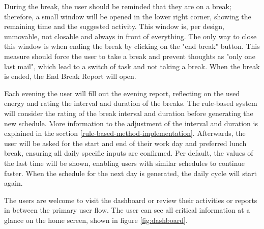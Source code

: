 \documentclass{hasel_thesis}
\begin{document}
During the break, the user should be reminded that they are on a break; therefore, a small window will be opened in the lower right corner, showing the remaining time and the suggested activity. This window is, per design, unmovable, not closable and always in front of everything. The only way to close this window is when ending the break by clicking on the "end break" button. This measure should force the user to take a break and prevent thoughts as "only one last mail", which lead to a switch of task and not taking a break. When the break is ended, the End Break Report will open.


Each evening the user will fill out the evening report, reflecting on the used energy and rating the interval and duration of the breaks. The rule-based system will consider the rating of the break interval and duration before generating the new schedule. More information to the adjustment of the interval and duration is explained in the section \ref{rule-based-method-implementation}. Afterwards, the user will be asked for the start and end of their work day and preferred lunch break, ensuring all daily specific inputs are confirmed. Per default, the values of the last time will be shown, enabling users with similar schedules to continue faster. When the schedule for the next day is generated, the daily cycle will start again.

The users are welcome to visit the dashboard or review their activities or reports in between the primary user flow. The user can see all critical information at a glance on the home screen, shown in figure \ref{fig:dashboard}.
\end{document}
